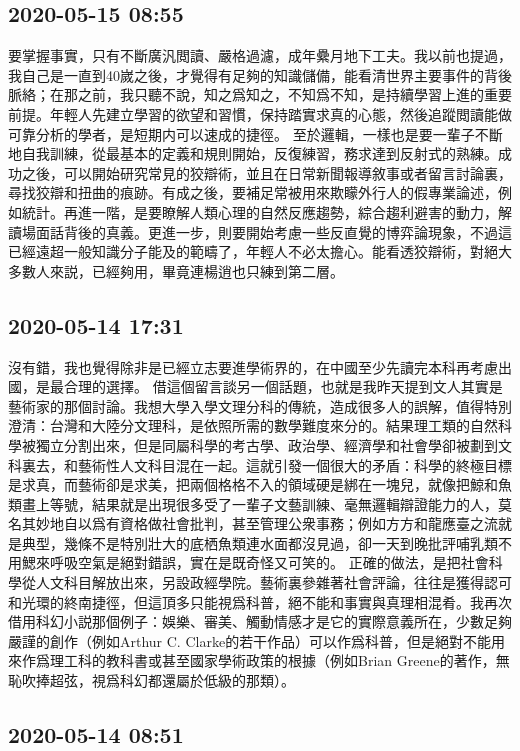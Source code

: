 \documentclass[twocolumn]{ctexart}
\begin{document}
\subsection*{2020-05-15 08:55}

要掌握事實，只有不斷廣汎閲讀、嚴格過濾，成年纍月地下工夫。我以前也提過，我自己是一直到40嵗之後，才覺得有足夠的知識儲備，能看清世界主要事件的背後脈絡；在那之前，我只聽不說，知之爲知之，不知爲不知，是持續學習上進的重要前提。年輕人先建立學習的欲望和習慣，保持踏實求真的心態，然後追蹤閲讀能做可靠分析的學者，是短期内可以速成的捷徑。
至於邏輯，一樣也是要一輩子不斷地自我訓練，從最基本的定義和規則開始，反復練習，務求達到反射式的熟練。成功之後，可以開始研究常見的狡辯術，並且在日常新聞報導敘事或者留言討論裏，尋找狡辯和扭曲的痕跡。有成之後，要補足常被用來欺矇外行人的假專業論述，例如統計。再進一階，是要瞭解人類心理的自然反應趨勢，綜合趨利避害的動力，解讀場面話背後的真義。更進一步，則要開始考慮一些反直覺的博弈論現象，不過這已經遠超一般知識分子能及的範疇了，年輕人不必太擔心。能看透狡辯術，對絕大多數人來説，已經夠用，畢竟連楊逍也只練到第二層。
\subsection*{2020-05-14 17:31}

沒有錯，我也覺得除非是已經立志要進學術界的，在中國至少先讀完本科再考慮出國，是最合理的選擇。 
借這個留言談另一個話題，也就是我昨天提到文人其實是藝術家的那個討論。我想大學入學文理分科的傳統，造成很多人的誤解，值得特別澄清：台灣和大陸分文理科，是依照所需的數學難度來分的。結果理工類的自然科學被獨立分割出來，但是同屬科學的考古學、政治學、經濟學和社會學卻被劃到文科裏去，和藝術性人文科目混在一起。這就引發一個很大的矛盾：科學的終極目標是求真，而藝術卻是求美，把兩個格格不入的領域硬是綁在一塊兒，就像把鯨和魚類畫上等號，結果就是出現很多受了一輩子文藝訓練、毫無邏輯辯證能力的人，莫名其妙地自以爲有資格做社會批判，甚至管理公衆事務；例如方方和龍應臺之流就是典型，幾條不是特別壯大的底栖魚類連水面都沒見過，卻一天到晚批評哺乳類不用鰓來呼吸空氣是絕對錯誤，實在是既奇怪又可笑的。 
正確的做法，是把社會科學從人文科目解放出來，另設政經學院。藝術裏參雜著社會評論，往往是獲得認可和光環的終南捷徑，但這頂多只能視爲科普，絕不能和事實與真理相混肴。我再次借用科幻小説那個例子：娛樂、審美、觸動情感才是它的實際意義所在，少數足夠嚴謹的創作（例如Arthur C. Clarke的若干作品）可以作爲科普，但是絕對不能用來作爲理工科的教科書或甚至國家學術政策的根據（例如Brian Greene的著作，無恥吹捧超弦，視爲科幻都還屬於低級的那類）。
\subsection*{2020-05-14 08:51}
\end{document}
